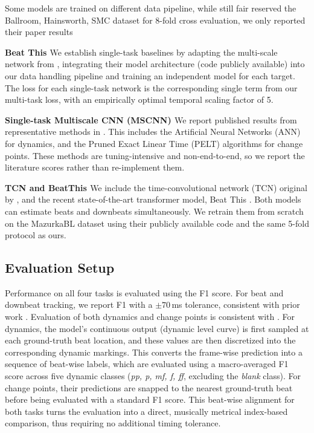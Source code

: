 \documentclass{article}
\begin{document}
Some models are trained on different data pipeline, while still fair reserved the Ballroom, Hainsworth, SMC dataset for 8-fold cross evaluation, we only reported their paper results 


\noindent\textbf{Beat This \cite{foscarin2024beat}}
We establish single-task baselines by adapting the multi-scale network from \cite{li2023frame}, integrating their model architecture (code publicly available) into our data handling pipeline and training an independent model for each target. The loss for each single-task network is the corresponding single term from our multi-task loss, with an empirically optimal temporal scaling factor of 5.

\noindent\textbf{Single-task Multiscale CNN (MSCNN) \cite{he2026dynest}} We report published results from representative methods in \cite{kosta2017thesis}. This includes the Artificial Neural Networks (ANN) for dynamics, and the Pruned Exact Linear Time (PELT) algorithms for change points. These methods are tuning-intensive and non-end-to-end, so we report the literature scores rather than re-implement them.

\noindent\textbf{TCN\cite{bock2020deconstruct} and BeatThis \cite{foscarin2024beat}} We include the time-convolutional network (TCN) original by \cite{bock2020deconstruct}, and the recent state-of-the-art transformer model, Beat This \cite{foscarin2024beat}. Both models can estimate beats and downbeats simultaneously. We retrain them from scratch on the MazurkaBL dataset using their publicly available code and the same 5-fold protocol as ours.


\subsection{Evaluation Setup}
\label{ssec:metrics}
Performance on all four tasks is evaluated using the F1 score. For beat and downbeat tracking, we report F1 with a \mbox{$\pm70$\,ms} tolerance, consistent with prior work \cite{bock2020deconstruct,foscarin2024beat}. Evaluation of both dynamics and change points is consistent with \cite{kosta2017thesis}. For dynamics, the model's continuous output (dynamic level curve) is first sampled at each ground-truth beat location, and these values are then discretized into the corresponding dynamic markings. This converts the frame-wise prediction into a sequence of beat-wise labels, which are evaluated using a macro-averaged F1 score across five dynamic classes (\textit{pp, p, mf, f, ff}, excluding the \textit{blank} class). For change points, their predictions are snapped to the nearest ground-truth beat before being evaluated with a standard F1 score. This beat-wise alignment for both tasks turns the evaluation into a direct, musically metrical index-based comparison, thus requiring no additional timing tolerance.
\end{document}
